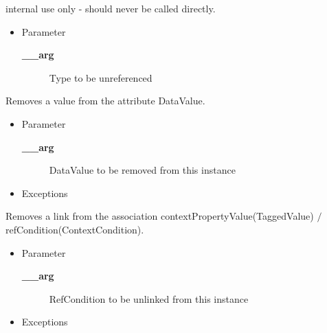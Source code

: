 \begin{desc}internal use only - should never be called directly.
\begin{itemize}
\item{Parameter
  \begin{description}
   \item[{\bf \_\_arg}]{Type to be unreferenced}
  \end{description}}
\end{itemize}
\end{desc}

\begin{desc}Removes a value from the attribute DataValue.
\begin{itemize}
\item{Parameter
  \begin{description}
   \item[{\bf \_\_arg}]{DataValue to be removed from this instance}
  \end{description}}
\end{itemize}
\begin{itemize}
\item{{Exceptions}
}
\end{itemize}
\end{desc}

\begin{desc}Removes a link from the association contextPropertyValue(TaggedValue)
 $/$ refCondition(ContextCondition).
\begin{itemize}
\item{Parameter
  \begin{description}
   \item[{\bf \_\_arg}]{RefCondition to be unlinked from this instance}
  \end{description}}
\end{itemize}
\begin{itemize}
\item{{Exceptions}
}
\end{itemize}
\end{desc}

